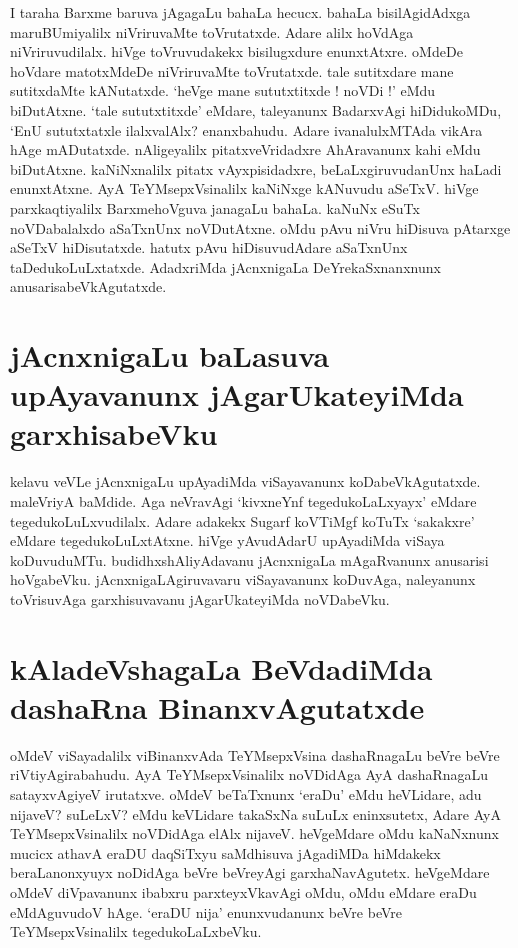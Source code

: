 I taraha Barxme baruva jAgagaLu bahaLa hecucx. bahaLa bisilAgidAdxga maruBUmiyalilx niVriruvaMte toVrutatxde. Adare alilx hoVdAga niVriruvudilalx. hiVge toVruvudakekx bisilugxdure enunxtAtxre. oMdeDe hoVdare matotxMdeDe niVriruvaMte toVrutatxde. tale sutitxdare mane sutitxdaMte kANutatxde. `heVge mane sututxtitxde ! noVDi !' eMdu biDutAtxne. `tale sututxtitxde' eMdare, taleyanunx BadarxvAgi hiDidukoMDu, `EnU sututxtatxle ilalxvalAlx? enanxbahudu. Adare ivanalulxMTAda vikAra hAge mADutatxde. nAligeyalilx pitatxveVridadxre AhAravanunx kahi eMdu biDutAtxne. kaNiNxnalilx pitatx vAyxpisidadxre, beLaLxgiruvudanUnx haLadi enunxtAtxne. AyA TeYMsepxVsinalilx kaNiNxge kANuvudu aSeTxV. hiVge parxkaqtiyalilx  BarxmehoVguva janagaLu bahaLa. kaNuNx  eSuTx noVDabalalxdo aSaTxnUnx noVDutAtxne. oMdu pAvu niVru hiDisuva pAtarxge aSeTxV hiDisutatxde. hatutx pAvu hiDisuvudAdare aSaTxnUnx taDedukoLuLxtatxde. AdadxriMda jAcnxnigaLa DeYrekaSxnanxnunx anusarisabeVkAgutatxde.

\section*{jAcnxnigaLu baLasuva upAyavanunx jAgarUkateyiMda garxhisabeVku}

kelavu veVLe jAcnxnigaLu upAyadiMda viSayavanunx koDabeVkAgutatxde. maleVriyA baMdide. Aga neVravAgi `kivxneYnf tegedukoLaLxyayx' eMdare tegedukoLuLxvudilalx. Adare adakekx Sugarf koVTiMgf koTuTx `sakakxre' eMdare tegedukoLuLxtAtxne. hiVge yAvudAdarU upAyadiMda viSaya koDuvuduMTu. budidhxshAliyAdavanu jAcnxnigaLa mAgaRvanunx anusarisi hoVgabeVku. jAcnxnigaLAgiruvavaru viSayavanunx koDuvAga, naleyanunx toVrisuvAga garxhisuvavanu jAgarUkateyiMda noVDabeVku.

\section*{kAladeVshagaLa BeVdadiMda dashaRna BinanxvAgutatxde}

oMdeV viSayadalilx viBinanxvAda TeYMsepxVsina dashaRnagaLu beVre beVre  riVtiyAgirabahudu. AyA TeYMsepxVsinalilx noVDidAga AyA dashaRnagaLu satayxvAgiyeV irutatxve. oMdeV beTaTxnunx `eraDu' eMdu heVLidare, adu nijaveV? suLeLxV? eMdu keVLidare takaSxNa suLuLx eninxsutetx, Adare AyA TeYMsepxVsinalilx noVDidAga elAlx nijaveV. heVgeMdare oMdu kaNaNxnunx mucicx athavA eraDU daqSiTxyu saMdhisuva jAgadiMDa hiMdakekx beraLanonxyuyx noDidAga beVre beVreyAgi garxhaNavAgutetx. heVgeMdare  oMdeV diVpavanunx ibabxru parxteyxVkavAgi oMdu, oMdu eMdare eraDu eMdAguvudoV hAge. `eraDU nija' enunxvudanunx beVre beVre TeYMsepxVsinalilx tegedukoLaLxbeVku.

